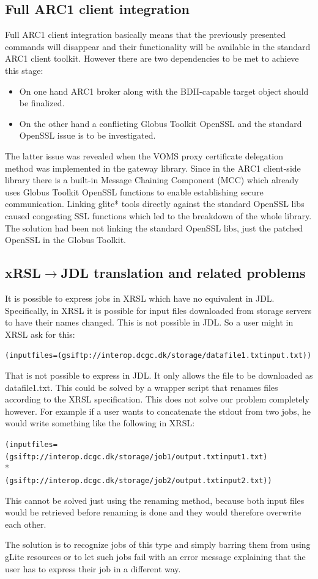 \documentclass{article}
\begin{document}
\subsection{Full ARC1 client integration}
Full ARC1 client integration basically means that the previously presented commands will disappear and their functionality will be available in the standard ARC1 client toolkit. However there are two dependencies to be met to achieve this stage:
\begin{itemize}
\item On one hand ARC1 broker along with the BDII-capable target object should be finalized.
\item On the other hand a conflicting Globus Toolkit OpenSSL and the standard OpenSSL issue is to be investigated.
\end{itemize}
The latter issue was revealed when the VOMS proxy certificate delegation method was implemented in the gateway library. Since in the ARC1 client-side library there is a built-in Message Chaining Component (MCC) which already uses Globus Toolkit OpenSSL functions to enable establishing secure communication. Linking glite* tools directly against the standard OpenSSL libs caused congesting SSL functions which led to the breakdown of the whole library. The solution had been not linking the standard OpenSSL libs, just the patched OpenSSL in the Globus Toolkit.
\subsection{xRSL${\rightarrow}$JDL translation and related problems}
It is possible to express jobs in XRSL which have no equivalent in JDL. Speciﬁcally, in XRSL it is possible for input files downloaded from storage servers to have their names changed. This is not possible in JDL. So a user might in XRSL ask for this:
\begin{shaded}
\verb#(inputfiles=(gsiftp://interop.dcgc.dk/storage/datafile1.txtinput.txt))#
\end{shaded}
That is not possible to express in JDL. It only allows the file to be downloaded as datafile1.txt. This could be solved by a wrapper script that renames files according to the XRSL speciﬁcation. This does not solve our problem completely however. For example if a user wants to concatenate the stdout from two jobs, he would write something like the following in XRSL:
\begin{shaded}
\verb#(inputfiles=(gsiftp://interop.dcgc.dk/storage/job1/output.txtinput1.txt)#\\*
\verb#            (gsiftp://interop.dcgc.dk/storage/job2/output.txtinput2.txt))#
\end{shaded}
This cannot be solved just using the renaming method, because both input files would be retrieved before renaming is done and they would therefore overwrite each other.\par
The solution is to recognize jobs of this type and simply barring them from using gLite resources or to let such jobs fail with an error message explaining that the user has to express their job in a different way.
\end{document}
